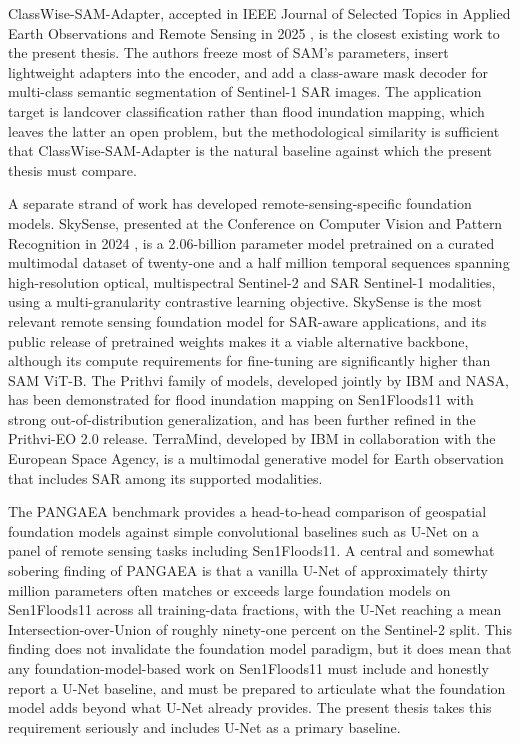 \documentclass[11pt,a4paper,oneside]{report}
\begin{document}
ClassWise-SAM-Adapter, accepted in IEEE Journal of Selected Topics in Applied Earth Observations and Remote Sensing in 2025 \cite{Pu2025CWSAM}, is the closest existing work to the present thesis. The authors freeze most of SAM's parameters, insert lightweight adapters into the encoder, and add a class-aware mask decoder for multi-class semantic segmentation of Sentinel-1 SAR images. The application target is landcover classification rather than flood inundation mapping, which leaves the latter an open problem, but the methodological similarity is sufficient that ClassWise-SAM-Adapter is the natural baseline against which the present thesis must compare.

A separate strand of work has developed remote-sensing-specific foundation models. SkySense, presented at the Conference on Computer Vision and Pattern Recognition in 2024 \cite{Guo2024SkySense}, is a 2.06-billion parameter model pretrained on a curated multimodal dataset of twenty-one and a half million temporal sequences spanning high-resolution optical, multispectral Sentinel-2 and SAR Sentinel-1 modalities, using a multi-granularity contrastive learning objective. SkySense is the most relevant remote sensing foundation model for SAR-aware applications, and its public release of pretrained weights makes it a viable alternative backbone, although its compute requirements for fine-tuning are significantly higher than SAM ViT-B. The Prithvi family of models, developed jointly by IBM and NASA, has been demonstrated for flood inundation mapping on Sen1Floods11 with strong out-of-distribution generalization, and has been further refined in the Prithvi-EO 2.0 release. TerraMind, developed by IBM in collaboration with the European Space Agency, is a multimodal generative model for Earth observation that includes SAR among its supported modalities.

The PANGAEA benchmark \cite{Marsocci2024PANGAEA} provides a head-to-head comparison of geospatial foundation models against simple convolutional baselines such as U-Net on a panel of remote sensing tasks including Sen1Floods11. A central and somewhat sobering finding of PANGAEA is that a vanilla U-Net of approximately thirty million parameters often matches or exceeds large foundation models on Sen1Floods11 across all training-data fractions, with the U-Net reaching a mean Intersection-over-Union of roughly ninety-one percent on the Sentinel-2 split. This finding does not invalidate the foundation model paradigm, but it does mean that any foundation-model-based work on Sen1Floods11 must include and honestly report a U-Net baseline, and must be prepared to articulate what the foundation model adds beyond what U-Net already provides. The present thesis takes this requirement seriously and includes U-Net as a primary baseline.
\end{document}
